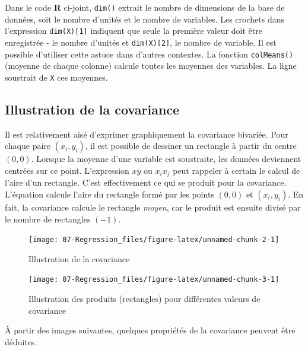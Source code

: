 \documentclass[
]{book}
\begin{document}
Dans le code \textbf{R} ci-joint, \texttt{dim()} extrait le nombre de dimensions de la base de données, soit le nombre d'unités et le nombre de variables. Les crochets dans l'expression \texttt{dim(X){[}1{]}} indiquent que seule la première valeur doit être enregistrée - le nombre d'unités et \texttt{dim(X){[}2{]}}, le nombre de variable. Il est possible d'utiliser cette astuce dans d'autres contextes. La fonction \texttt{colMeans()} (moyenne de chaque colonne) calcule toutes les moyennes des variables. La ligne soustrait de \texttt{X} ces moyennes.

\hypertarget{illustration-de-la-covariance}{%
\subsection{Illustration de la covariance}\label{illustration-de-la-covariance}}

Il est relativement aisé d'exprimer graphiquement la covariance bivariée. Pour chaque paire \((x_i,y_i)\), il est possible de dessiner un rectangle à partir du centre \((0, 0)\). Lorsque la moyenne d'une variable est soustraite, les données deviennent centrées sur ce point. L'expression \(xy\) ou \(x_ix_j\) peut rappeler à certain le calcul de l'aire d'un rectangle. C'est effectivement ce qui se produit pour la covariance. L'équation calcule l'aire du rectangle formé par les points \((0,0)\) et \((x_i,y_i)\). En fait, la covariance calcule le rectangle \emph{moyen}, car le produit est ensuite divisé par le nombre de rectangles \((-1)\).

\begin{figure}

{\centering \texttt{[image: 07-Regression\_files/figure-latex/unnamed-chunk-2-1]} 

}

\caption{Illustration de la covariance}\label{fig:unnamed-chunk-2}
\end{figure}

\begin{figure}

{\centering \texttt{[image: 07-Regression\_files/figure-latex/unnamed-chunk-3-1]} 

}

\caption{Illustration des produits (rectangles) pour différentes valeurs de covariance}\label{fig:unnamed-chunk-3}
\end{figure}

À partir des images suivantes, quelques propriétés de la covariance peuvent être déduites.
\end{document}
